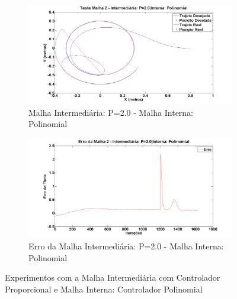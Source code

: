     \begin{figure}[!htb]
    	\centering
    	\begin{subfigure}{1.0\textwidth}
    		\centering
    		\includegraphics[width=.9\linewidth]{./Testes/Malha2/P2.0/Polinomial/m2PosPol}
    		\caption{Malha Intermediária: P=2.0 - Malha Interna: Polinomial}
    		\label{fig:m2polpos}
    	\end{subfigure}
    	\begin{subfigure}{1.0\textwidth}
    		\centering
    		\includegraphics[width=.9\linewidth]{./Testes/Malha2/P2.0/Polinomial/m2ErroTheta}
    		\caption{Erro da Malha Intermediária: P=2.0 - Malha Interna: Polinomial}
    		\label{fig:m2piderr}
    	\end{subfigure}
    	\caption{Experimentos com a Malha Intermediária com Controlador Proporcional e Malha Interna: Controlador Polinomial}
    	\label{fig:m2pol}
    \end{figure}
 
